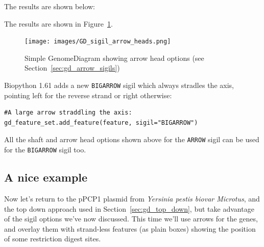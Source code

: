 \documentclass{report}
\begin{document}
\begin{htmlonly}
\noindent The results are shown below:


\end{htmlonly}
\begin{latexonly}
\noindent The results are shown in Figure~\ref{fig:gd_sigil_arrow_heads}.
\begin{figure}[htbp]
\centering
\texttt{[image: images/GD\_sigil\_arrow\_heads.png]}
\caption{Simple GenomeDiagram showing arrow head options
(see Section~\ref{sec:gd_arrow_sigils})}
\label{fig:gd_sigil_arrow_heads}
\end{figure}
\end{latexonly}

Biopython 1.61 adds a new \verb|BIGARROW| sigil which always stradles
the axis, pointing left for the reverse strand or right otherwise:

\begin{verbatim}
#A large arrow straddling the axis:
gd_feature_set.add_feature(feature, sigil="BIGARROW")
\end{verbatim}

\noindent All the shaft and arrow head options shown above for the
\verb|ARROW| sigil can be used for the \verb|BIGARROW| sigil too.

\subsection{A nice example}
\label{sec:gd_nice_example}

Now let's return to the pPCP1 plasmid from \textit{Yersinia pestis biovar
Microtus}, and the top down approach used in Section~\ref{sec:gd_top_down},
but take advantage of the sigil options we've now discussed.  This time
we'll use arrows for the genes, and overlay them with strand-less features
(as plain boxes) showing the position of some restriction digest sites.
\end{document}
